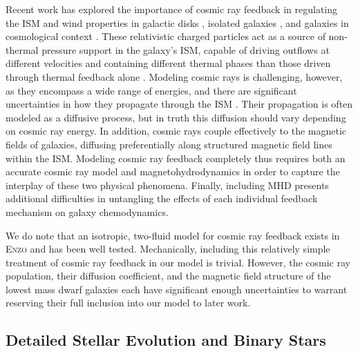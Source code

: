 Recent work has explored the importance of cosmic ray feedback in regulating the ISM and wind properties in galactic disks \citep{Hanasz2013,GirichidisCR,Simpson2016,Farber2018}, isolated galaxies \citep{SalemBryanCorlies,Salem2015,Pakmor2016,Ruszkowski2017}, and galaxies in cosmological context \citep{SalemBryanHummels}. These relativistic charged particles act as a source of non-thermal pressure support in the galaxy's ISM, capable of driving outflows at different velocities and containing different thermal phases than those driven through thermal feedback alone \citep{SalemBryanCorlies}. Modeling cosmic rays is challenging, however, as they encompass a wide range of energies, and there are significant uncertainties in how they propagate through the ISM \citep[e.g.][]{Wiener2017}. Their propagation is often modeled as a diffusive process, but in truth this diffusion should vary depending on cosmic ray energy. In addition, cosmic rays couple effectively to the magnetic fields of galaxies, diffusing preferentially along structured magnetic field lines within the ISM. Modeling cosmic ray feedback completely thus requires both an accurate cosmic ray model and magnetohydrodynamics in order to capture the interplay of these two physical phenomena. Finally, including MHD presents additional difficulties in untangling the effects of each individual feedback mechanism on galaxy chemodynamics.

We do note that an isotropic, two-fluid model for cosmic ray feedback exists in  \textsc{Enzo} \citep{SalemBryan2014,Salem2015} and has been well tested. Mechanically, including this relatively simple treatment of cosmic ray feedback in our model is trivial. However, the cosmic ray population, their diffusion coefficient, and the magnetic field structure of the lowest mass dwarf galaxies each have significant enough uncertainties to warrant reserving their full inclusion into our model to later work.

\subsection{Detailed Stellar Evolution and Binary Stars}
\label{ch1:sec:binary stars}

